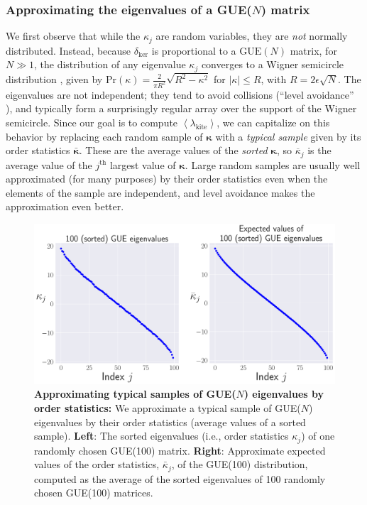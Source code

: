 \documentclass[aps,pra, twocolumn]{revtex4-1}
\newcommand{\expect}[1]{\ensuremath{\left\langle#1\right\rangle}}
\newcommand{\bvec}[1]{\boldsymbol{#1}}
\begin{document}
\subsubsection{Approximating the eigenvalues of a GUE($N$) matrix}
We first observe that while the $\kappa_j$ are random variables, they are \emph{not} normally distributed.  Instead, because $\delta_{\mathrm{ker}}$ is proportional to a $\mathrm{GUE}(N)$ matrix, for $N\gg1$, the distribution of any eigenvalue $\kappa_{j}$
converges to a Wigner semicircle distribution \cite{Wigner1958}, given by $\mathrm{Pr}(\kappa) = \frac{2}{\pi R^{2}}\sqrt{R^{2}-\kappa^{2}}$ for $|\kappa| \leq R$, with $R = 2\epsilon\sqrt{N}$.  The eigenvalues are not independent; they tend to avoid collisions (``level avoidance'' \cite{Tao2013}), 
and typically form a surprisingly regular array over the support of the Wigner semicircle.  Since our goal is to compute $\expect{\lambda_{\mathrm{kite}}}$, we can capitalize on this behavior by replacing each random sample of $\bvec{\kappa}$ with a 
\emph{typical sample} given by its order statistics $\bar{\bvec{\kappa}}$.  These are the average values of the \emph{sorted} 
$\bvec{\kappa}$, so $\overline{\kappa}_j$ is the average value of the $j^{\mathrm{th}}$ largest value of $\bvec{\kappa}$.  Large random samples 
are usually well approximated (for many purposes) by their order statistics even when the elements of the sample are 
independent, and level avoidance makes the approximation even better. 

\begin{figure}
\includegraphics[width=\columnwidth]{Images/Figure_7.pdf}
\caption{\textbf{Approximating typical samples of GUE($N$) eigenvalues by order statistics:} We approximate a typical sample of GUE($N$) eigenvalues by their order statistics (average values of a sorted sample).  \textbf{Left}:  The sorted eigenvalues (i.e., order statistics $\kappa_{j}$) of one randomly chosen GUE(100) matrix.  \textbf{Right}:  Approximate expected values of the order statistics, $\bar{\kappa}_{j}$, of the GUE(100) distribution, computed as the average of the sorted eigenvalues of 100 randomly chosen GUE(100) matrices.}
\label{fig:orderstatistics1}
\end{figure}
\end{document}

